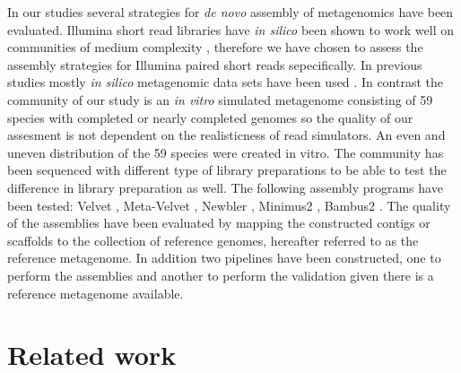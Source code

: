 \documentclass[a4paper,12pt]{article}
\begin{document}
In our studies several strategies for {\em de novo} assembly of metagenomics
have been evaluated.  Illumina short read libraries have {\em in silico } been shown
to work well on communities of medium complexity \cite{Mende22384016},
therefore we have chosen to assess the assembly strategies for Illumina paired
short reads sepecifically. In previous studies mostly {\em in silico } metagenomic
data sets have been used \cite{Pignatelli21625384,Mavromatis17468765}. In
contrast the community of our study is an {\em in vitro } simulated metagenome
consisting of 59 species with completed or nearly completed genomes so the
quality of our assesment is not dependent on the realisticness of read
simulators. An even and uneven distribution of the 59 species were created in
vitro. The community has been sequenced with different type of library
preparations to be able to test the difference in library preparation as well.
The following assembly programs have been tested: Velvet
\cite{Zerbino18349386}, Meta-Velvet \cite{MetaVelvet}, Newbler
\cite{Quinn18755037}, Minimus2 \cite{Sommer17324286}, Bambus2
\cite{Koren21926123}. The quality of the assemblies have been evaluated by
mapping the constructed contigs or scaffolds to the collection of reference
genomes, hereafter referred to as the reference metagenome. In addition two
pipelines have been constructed, one to perform the assemblies and another to
perform the validation given there is a reference metagenome available.

\section{Related work}
\end{document}
